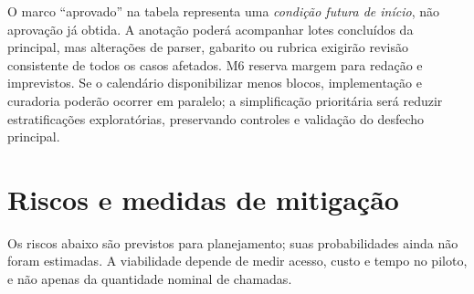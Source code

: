 \begin{table}[ht]
\caption{Cronograma candidato por blocos mensais relativos e entregas verificáveis. Fonte: elaboração própria.}
\label{tab:cronograma}
\end{table}

O marco ``aprovado'' na tabela representa uma \emph{condição futura de início}, não aprovação já obtida. A anotação poderá acompanhar lotes concluídos da principal, mas alterações de parser, gabarito ou rubrica exigirão revisão consistente de todos os casos afetados. M6 reserva margem para redação e imprevistos. Se o calendário disponibilizar menos blocos, implementação e curadoria poderão ocorrer em paralelo; a simplificação prioritária será reduzir estratificações exploratórias, preservando controles e validação do desfecho principal.

\section{Riscos e medidas de mitigação}
\label{sec:riscos-viabilidade}
Os riscos abaixo são previstos para planejamento; suas probabilidades ainda não foram estimadas. A viabilidade depende de medir acesso, custo e tempo no piloto, e não apenas da quantidade nominal de chamadas.

